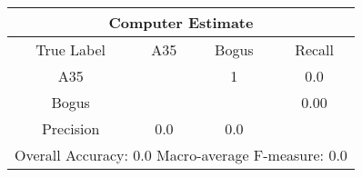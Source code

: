 \begin{tabular}{|c||c|c||c|}
\hline 
\multicolumn{4}{|c|}{Computer Estimate}\\
\hline 
True Label & A35 & Bogus & Recall \\
\hline 
A35 &  & 1 &  0.0\\
Bogus &  &  &  0.00\\
\hline 
Precision & 0.0 & 0.0 & \\
\hline 
\multicolumn{4}{|c|}{Overall Accuracy: 0.0 Macro-average F-measure: 0.0}\\
\hline 
\end{tabular} 
